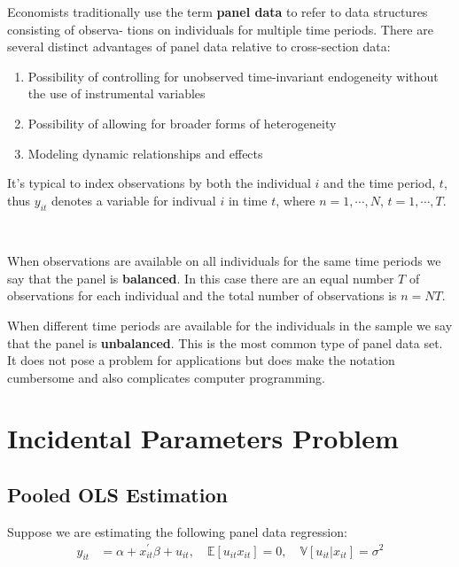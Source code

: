 Economists traditionally use the term \textbf{panel data} to refer to data structures consisting of observa-
tions on individuals for multiple time periods. 
There are several distinct advantages of panel data relative to cross-section data:
\begin{enumerate}
  \item Possibility of controlling for unobserved time-invariant endogeneity without the use of instrumental variables
  \item Possibility of allowing for broader forms of heterogeneity
  \item Modeling dynamic relationships and effects
\end{enumerate} 

It's typical to index observations by both the individual $i$ and the time period, $t$,
thus $y_{it} $ denotes a variable for indivual $i$ in time $t$, where $n=1, \cdots, N$, $t=1, \cdots, T.$

\begin{definition}
  \

  When observations are available on all individuals for the same time periods we say that the panel is \textbf{balanced}. 
  In this case there are an equal number $T$ of observations for each individual and the total number of observations is $n = NT$.

  When different time periods are available for the individuals in the sample we say that the panel is \textbf{unbalanced}. 
  This is the most common type of panel data set. 
  It does not pose a problem for applications but does make the notation cumbersome and also complicates computer programming.
\end{definition}

\section{Incidental Parameters Problem}

\subsection{Pooled OLS Estimation}\label{sec:POLS}

Suppose we are estimating the following panel data regression:
\begin{align*}
  y_{it} &= \alpha +x_{it}^{\prime} \beta +u_{it}, \quad \mathbb{E}[u_{it} x_{it}] = 0, \quad \mathbb{V}[u_{it} | x_{it}] = \sigma^2
\end{align*}

